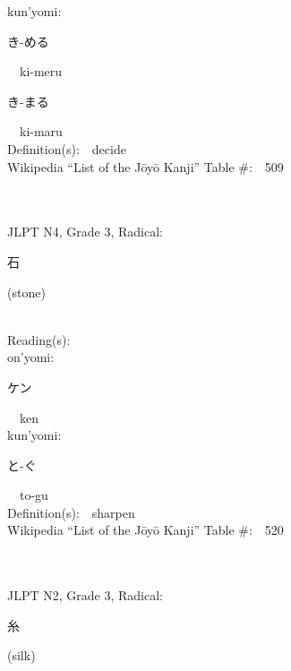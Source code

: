 \begin{multicols}{2}
{\hspace*{1em}}kun'yomi:\ \ \\
{\hspace*{2em}}{\begin{CJK}{UTF8}{min} き-める \end{CJK}}\ \ ki-meru\ \ \\
{\hspace*{2em}}{\begin{CJK}{UTF8}{min} き-まる \end{CJK}}\ \ ki-maru\ \ \\
Definition(s):\ \ decide \\
Wikipedia ``List of the J\=oy\=o Kanji'' Table \#:\ \ 509 \\
\ \ \\
{\fontsize{34pt}{40pt}  }\ \ \\  %
{JLPT N4, Grade 3, Radical:\ \ {\begin{CJK}{UTF8}{min} 石 \end{CJK}} (stone) } \\
Reading(s):\ \ \\
{\hspace*{1em}}on'yomi:\ \ \\
{\hspace*{2em}}{\begin{CJK}{UTF8}{min} ケン \end{CJK}}\ \ ken\ \ \\
{\hspace*{1em}}kun'yomi:\ \ \\
{\hspace*{2em}}{\begin{CJK}{UTF8}{min} と-ぐ \end{CJK}}\ \ to-gu\ \ \\
Definition(s):\ \ sharpen \\
Wikipedia ``List of the J\=oy\=o Kanji'' Table \#:\ \ 520 \\
\ \ \\
{\fontsize{34pt}{40pt}  }\ \ \\  %
{JLPT N2, Grade 3, Radical:\ \ {\begin{CJK}{UTF8}{min} 糸 \end{CJK}} (silk) } \\

\end{multicols}
